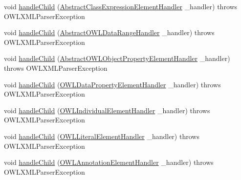 \begin{DoxyCompactItemize}
\item 
void \hyperlink{classorg_1_1coode_1_1owlapi_1_1owlxmlparser_1_1_abstract_o_w_l_element_handler_3_01_o_01_4_aa61891086e1bda39c108dadded65cd16}{handle\-Child} (\hyperlink{classorg_1_1coode_1_1owlapi_1_1owlxmlparser_1_1_abstract_class_expression_element_handler}{Abstract\-Class\-Expression\-Element\-Handler} \-\_\-handler)  throws O\-W\-L\-X\-M\-L\-Parser\-Exception 
\item 
void \hyperlink{classorg_1_1coode_1_1owlapi_1_1owlxmlparser_1_1_abstract_o_w_l_element_handler_3_01_o_01_4_a0c1c2ebfab9fdc96c33014362ed8b63e}{handle\-Child} (\hyperlink{classorg_1_1coode_1_1owlapi_1_1owlxmlparser_1_1_abstract_o_w_l_data_range_handler}{Abstract\-O\-W\-L\-Data\-Range\-Handler} \-\_\-handler)  throws O\-W\-L\-X\-M\-L\-Parser\-Exception 
\item 
void \hyperlink{classorg_1_1coode_1_1owlapi_1_1owlxmlparser_1_1_abstract_o_w_l_element_handler_3_01_o_01_4_a74938b972e7ebf891a138e26fb8b74d3}{handle\-Child} (\hyperlink{classorg_1_1coode_1_1owlapi_1_1owlxmlparser_1_1_abstract_o_w_l_object_property_element_handler}{Abstract\-O\-W\-L\-Object\-Property\-Element\-Handler} \-\_\-handler)  throws O\-W\-L\-X\-M\-L\-Parser\-Exception 
\item 
void \hyperlink{classorg_1_1coode_1_1owlapi_1_1owlxmlparser_1_1_abstract_o_w_l_element_handler_3_01_o_01_4_a2ef5197dbbdfa5f2748a5672c9c25c86}{handle\-Child} (\hyperlink{classorg_1_1coode_1_1owlapi_1_1owlxmlparser_1_1_o_w_l_data_property_element_handler}{O\-W\-L\-Data\-Property\-Element\-Handler} \-\_\-handler)  throws O\-W\-L\-X\-M\-L\-Parser\-Exception 
\item 
void \hyperlink{classorg_1_1coode_1_1owlapi_1_1owlxmlparser_1_1_abstract_o_w_l_element_handler_3_01_o_01_4_aec6a7a77aac623f7c90b38cf48c15eb2}{handle\-Child} (\hyperlink{classorg_1_1coode_1_1owlapi_1_1owlxmlparser_1_1_o_w_l_individual_element_handler}{O\-W\-L\-Individual\-Element\-Handler} \-\_\-handler)  throws O\-W\-L\-X\-M\-L\-Parser\-Exception 
\item 
void \hyperlink{classorg_1_1coode_1_1owlapi_1_1owlxmlparser_1_1_abstract_o_w_l_element_handler_3_01_o_01_4_a4e4086c8198834993a91df5e474ee1e3}{handle\-Child} (\hyperlink{classorg_1_1coode_1_1owlapi_1_1owlxmlparser_1_1_o_w_l_literal_element_handler}{O\-W\-L\-Literal\-Element\-Handler} \-\_\-handler)  throws O\-W\-L\-X\-M\-L\-Parser\-Exception 
\item 
void \hyperlink{classorg_1_1coode_1_1owlapi_1_1owlxmlparser_1_1_abstract_o_w_l_element_handler_3_01_o_01_4_af076cfc52dbd5e7b3bf145e40313a9d8}{handle\-Child} (\hyperlink{classorg_1_1coode_1_1owlapi_1_1owlxmlparser_1_1_o_w_l_annotation_element_handler}{O\-W\-L\-Annotation\-Element\-Handler} \-\_\-handler)  throws O\-W\-L\-X\-M\-L\-Parser\-Exception 

\end{DoxyCompactItemize}
